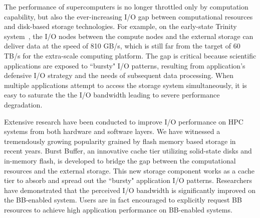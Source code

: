 The performance of supercomputers is no longer throttled only by computation capability,
but also the ever-increasing I/O gap
between computational resources and disk-based storage technologies.
For example, on the early-state Trinity system~\cite{TrinitySystem}, the I/O nodes between
the compute nodes and the external storage can deliver data at  the speed of 810 GB/s, 
which is still far from the target of 60 TB/s for the extra-scale computing platform\cite{Shalf:HPCCS:2010}.
The gap is critical because scientific applications are exposed to
``bursty" I/O patterns\cite{Carns:MSST:2011, Kim:PDSW:2010},
resulting from application's
defensive I/O strategy\cite{Latham:CSD:2012, Naik:ICPPW:2009, Dennis:CUG:2009}
and the needs of subsequent data processing.
When multiple applications attempt to access the storage system simultaneously, it is easy to saturate the 
the I/O bandwidth leading to severe performance degradation.


Extensive research have been conducted to improve I/O performance on HPC systems from
both hardware and software layers.
We have witnessed a tremendously growing popularity grained by flash memory based storage in recent years.
Burst Buffer, an innovative cache tier utilizing solid-state disks and in-memory flash, 
is developed to bridge the gap between the computational resources and the external storage.
This new storage component works as a cache tier to absorb and spread out
the ``bursty" application I/O patterns\cite{Bent:HBP:2011, Grider:EXA:2010}.
Researchers\cite{Liu:MSST:2012} have demonstrated that the perceived I/O
bandwidth is significantly improved on the BB-enabled system.
Users are in fact encouraged to explicitly request BB resources to achieve high application performance on BB-enabled systems\cite{apex-workflow}.

